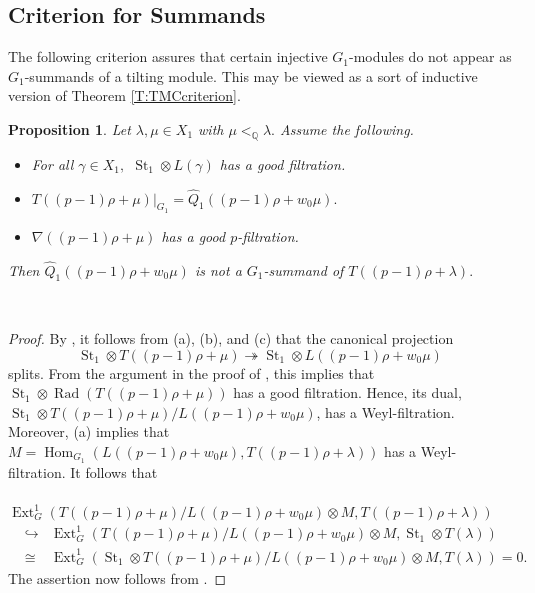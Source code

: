 \documentclass[twoside,11pt,reqno]{amsart}
\newcommand{\Hom}{\ensuremath{\operatorname{Hom}}}
\newcommand{\Rad}{\ensuremath{\operatorname{Rad} }}
\newcommand{\Ext}{\operatorname{Ext}}
\newcommand{\0}{\bar 0}
\newcommand{\1}{\bar 1}
\newcommand{\la}{\lambda}
\newcommand{\St}{\operatorname{St}}
\newcommand{\hQ}{\widehat{Q}}
\newtheorem{prop}{Proposition}[subsection]
\theoremstyle{definition}
\numberwithin{equation}{subsection}
\begin{document}
\subsection{Criterion for Summands}
The following criterion assures that certain injective $G_1$-modules do not appear as $G_1$-summands of a tilting module. This may be viewed as a sort of inductive version of Theorem \ref{T:TMCcriterion}.
﻿
\begin{prop}\label{P:Summand}
Let $\la, \mu \in X_1$ with $\mu <_{\mathbb{Q}} \la.$
Assume the following. 
\begin{itemize}
\item[(a)] For all $\gamma \in X_1,$ $ \St_1 \otimes L(\gamma)$ has a good filtration.
\item[(b)] $T((p-1)\rho + \mu)|_{G_1} = \hQ_1((p-1)\rho+w_0\mu).$
\item[(c)] $\nabla((p-1)\rho + \mu)$ has a good $p$-filtration.
\end{itemize}
Then $\hQ_1((p-1)\rho+w_0\mu)$ is not a $G_1$-summand of $T((p-1)\rho + \la).$
\end{prop}
﻿
\begin{proof}
By \cite[Theorem 4.3.2]{BNPS22a}, it follows from (a), (b), and (c) that the canonical projection
$$\St_1 \otimes T((p-1)\rho + \mu) \twoheadrightarrow \St_1 \otimes L((p-1)\rho+w_0\mu)$$ splits. 
From the argument in the proof of \cite[Proposition 4.2.2]{BNPS22a}, this implies that $\St_1 \otimes \Rad(T((p-1)\rho + \mu))$ has a good filtration. Hence, its dual, $\St_1 \otimes T((p-1)\rho + \mu)/L((p-1)\rho+w_0\mu)$, has a Weyl-filtration. Moreover, (a) implies that $M=\Hom_{G_1}(L((p-1)\rho+w_0\mu), T((p-1)\rho+\la))$ has a Weyl-filtration.
It follows that\\ \\
$\Ext_G^1(T((p-1)\rho + \mu)/L((p-1)\rho+w_0\mu)\otimes M, T((p-1)\rho+\la))$
\begin{eqnarray*} &\hookrightarrow&\Ext_G^1(T((p-1)\rho + \mu)/L((p-1)\rho+w_0\mu)\otimes M, \St_1 \otimes T(\la))\\
&\cong & \Ext_G^1(\St_1 \otimes T((p-1)\rho + \mu)/L((p-1)\rho+w_0\mu) \otimes M,  T(\la))=0.
\end{eqnarray*}
The assertion now follows from \cite[Lemma 4.2.2]{So18}.
\end{proof}
﻿
\end{document}
